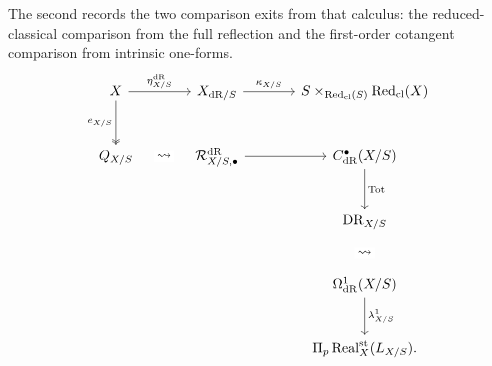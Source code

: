 The second records the two comparison exits from that calculus: the
reduced-classical comparison from the full reflection and the first-order
cotangent comparison from intrinsic one-forms.
\[
\begin{tikzcd}[column sep=large,row sep=large]
  X \arrow[r,"\eta_{X/S}^{\mathrm{dR}}"] \arrow[d,two heads,"e_{X/S}"']
  & X_{\mathrm{dR}/S}
    \arrow[r,"\kappa_{X/S}"]
  & S\times_{\operatorname{Red}_{\mathrm{cl}}(S)}\operatorname{Red}_{\mathrm{cl}}(X)
  \\
  Q_{X/S}
    \arrow[r,phantom,"\leadsto" description]
  & \mathcal R^{\mathrm{dR}}_{X/S,\bullet}
    \arrow[r]
  & C^\bullet_{\mathrm{dR}}(X/S)
    \arrow[d,"\operatorname*{Tot}"]
  \\
  && \mathrm{DR}_{X/S}
    \arrow[d,phantom,"\leadsto" description]
  \\
  && \Omega^1_{\mathrm{dR}}(X/S)
    \arrow[d,"\lambda^1_{X/S}"]
  \\
  && \Pi_p\operatorname{Real}^{\mathrm{st}}_X(L_{X/S}).
\end{tikzcd}
\]

